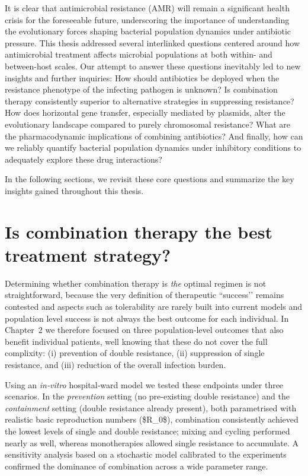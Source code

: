 \documentclass[../main.tex]{subfiles}
\begin{document}
It is clear that antimicrobial resistance (AMR) will remain a significant health crisis for the foreseeable future, underscoring the importance of understanding the evolutionary forces shaping bacterial population dynamics under antibiotic pressure.
This thesis addressed several interlinked questions centered around how antimicrobial treatment affects microbial populations at both within- and between-host scales.
Our attempt to answer these questions inevitably led to new insights and further inquiries:
How should antibiotics be deployed when the resistance phenotype of the infecting pathogen is unknown?
Is combination therapy consistently superior to alternative strategies in suppressing resistance?
How does horizontal gene transfer, especially mediated by plasmids, alter the evolutionary landscape compared to purely chromosomal resistance?
What are the pharmacodynamic implications of combining antibiotics?
And finally, how can we reliably quantify bacterial population dynamics under inhibitory conditions to adequately explore these drug interactions?

In the following sections, we revisit these core questions and summarize the key insights gained throughout this thesis.

\section{Is combination therapy the best treatment strategy?}

Determining whether combination therapy is \emph{the} optimal regimen is not straightforward, because the very definition of therapeutic “success’’ remains contested and aspects such as tolerability are rarely built into current models and population level success is not always the best outcome for each individual.  In Chapter~2 we therefore focused on three population‑level outcomes that also benefit individual patients, well knowing that these do not cover the full complixity: (i) prevention of double resistance, (ii) suppression of single resistance, and (iii) reduction of the overall infection burden.

Using an \textit{in‑vitro} hospital‑ward model we tested these endpoints under three scenarios.  In the \emph{prevention} setting (no pre‑existing double resistance) and the \emph{containment} setting (double resistance already present), both parametrised with realistic basic reproduction numbers (\$R\_0\$), combination consistently achieved the lowest levels of single and double resistance; mixing and cycling performed nearly as well, whereas monotherapies allowed single resistance to accumulate.  A sensitivity analysis based on a stochastic model calibrated to the experiments confirmed the dominance of combination across a wide parameter range.
\end{document}
